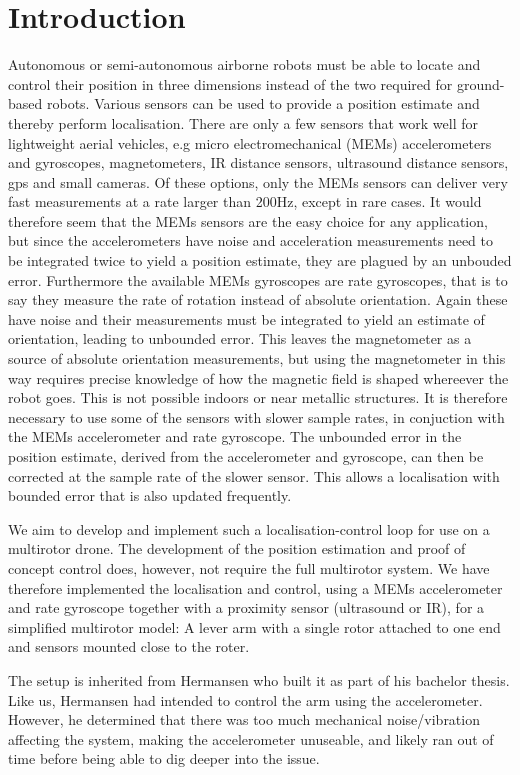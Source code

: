 \section{Introduction}
Autonomous or semi-autonomous airborne robots must be able to locate and control their position in three dimensions instead of
the two required for ground-based robots. Various sensors can be used to provide a position estimate and thereby perform localisation.
There are only a few sensors that work well for lightweight aerial vehicles, e.g
micro electromechanical (MEMs) accelerometers and gyroscopes, magnetometers, IR distance sensors, ultrasound distance sensors, gps and
small cameras. Of these options, only the MEMs sensors can deliver very fast measurements at a rate larger than 200Hz, except in rare cases.
It would therefore seem that the MEMs
sensors are the easy choice for any application, but since the accelerometers have noise and acceleration measurements need to be 
integrated twice to yield a position estimate, they are plagued by an unbouded error. Furthermore the available MEMs gyroscopes are rate 
gyroscopes, that is to say they measure the rate of rotation instead of absolute orientation. Again these have noise and their measurements
must be integrated to yield an estimate of orientation, leading to unbounded error. This leaves the magnetometer as a source of
absolute orientation measurements, but using the magnetometer in this way requires precise knowledge of how the magnetic field is 
shaped whereever the robot goes. This is not possible indoors or near metallic structures.
It is therefore necessary to use some of the sensors with slower sample rates, in conjuction with
the MEMs accelerometer and rate gyroscope. The unbounded error in the position estimate, derived from the accelerometer and gyroscope,
can then be corrected at the sample rate of the slower sensor. This allows a localisation with bounded error that is also updated
frequently. 

We aim to develop and implement such a localisation-control loop for use on a
multirotor drone. The development of the position estimation and proof of
concept control does, however, not require the full multirotor system.
We have therefore implemented the localisation 
and control, using a MEMs accelerometer and rate gyroscope together with a proximity sensor (ultrasound or IR), for a simplified multirotor model: 
A lever arm with a single rotor attached to one end and sensors mounted close to the roter.

The setup is inherited from Hermansen who built it as part of his bachelor thesis\cite{Hermansen2013a}.
Like us, Hermansen had intended to control the arm using the accelerometer. However, he determined that there was too much mechanical 
noise/vibration affecting the system, making the accelerometer unuseable, and
likely ran out of time before being able to dig deeper into the issue.

